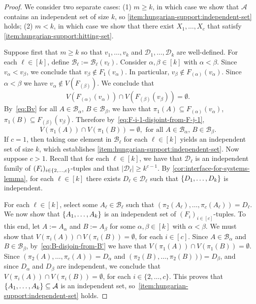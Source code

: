 \documentclass{patmorin}
\DeclarePairedDelimiter\set{\{}{\}}
\begin{document}
\begin{proof}
We consider two separate cases:
(1) $m\geq k$, in which case we show that $\mathcal{A}$ contains an independent set of size $k$, so \eqref{item:hungarian-support:independent-set} holds;
(2) $m<k$, in which case we show that there exist $X_1,\ldots,X_c$ that satisfy \eqref{item:hungarian-support:hitting-set}.

Suppose first that $m\geq k$ so that $v_1,\ldots,v_k$ and $\mathcal{D}_1,\ldots,\mathcal{D}_k$ are well-defined.  For each $\ell\in[k]$, define $\mathcal{B}_{\ell}:=\mathcal{B}_{\ell}(v_\ell)$. Consider $\alpha,\beta\in[k]$ with $\alpha<\beta$. Since $v_{\alpha} < v_{\beta}$, we conclude that $v_{\beta} \not\in F_1(v_{\alpha})$. In particular, $v_{\beta} \not\in F_{(\alpha)}(v_{\alpha})$. Since $\alpha<\beta$ we have $v_{\alpha}\not\in V(F_{(\beta)})$. We conclude that
\begin{equation}
  V(F_{(\alpha)}(v_{\alpha})) \cap V(F_{(\beta)}(v_{\beta})) = \emptyset.
  \label{eq:F-i-1-disjoint-from-F-j-1}
\end{equation}
By~\eqref{eq:Bv} for all $A\in \mathcal{B}_{\alpha}$, $B\in\mathcal{B}_{\beta}$, we have that
$\pi_1(A)\subseteq F_{(\alpha)}(v_{\alpha})$,  $\pi_1(B)\subseteq F_{(\beta)}(v_{\beta})$.
Therefore by~\eqref{eq:F-i-1-disjoint-from-F-j-1},
\begin{equation}
V(\pi_1(A)) \cap V(\pi_1(B))=\emptyset, \textrm{ for all $A\in\mathcal{B}_\alpha$, $B\in\mathcal{B}_\beta$.}
\label{eq:B-disjoin-from-B'}
\end{equation}
If $c=1$, then taking one element in $\mathcal{B}_\ell$ for each $\ell\in[k]$ yields an independent set of size $k$, which establishes \cref{item:hungarian-support:independent-set}.  Now suppose $c>1$.
Recall that for each $\ell\in[k]$,
we have that $\mathcal{D}_\ell$ is an independent family of
$(F_i)_{i\in\set{2,\ldots,c}}$-tuples and that
$|\mathcal{D}_{\ell}|\geq k^{c-1}$.
By \cref{cor:interface-for-systems-lemma}, for each $\ell\in[k]$ there exists $D_\ell\in\mathcal{D}_\ell$ such that $\set{D_1,\ldots,D_k}$ is independent.

For each $\ell\in[k]$, select some $A_\ell\in\mathcal{B}_\ell$ such that $(\pi_2(A_\ell),\ldots,\pi_c(A_\ell))=D_\ell$.   We now show that $\set{A_1,\ldots,A_k}$ is an independent set of $(F_i)_{i\in[c]}$-tuples.
To this end, let $A:=A_\alpha$ and $B:=A_\beta$ for some $\alpha,\beta\in[k]$ with $\alpha < \beta$.  We must show that $V(\pi_i(A))\cap V(\pi_i(B))=\emptyset$, for each $i\in[c]$.
Since $A\in\mathcal{B}_{\alpha}$ and $B\in\mathcal{B}_{\beta}$, by~\eqref{eq:B-disjoin-from-B'} we have that $V(\pi_1(A))\cap V(\pi_1(B))=\emptyset$.
Since $(\pi_2(A),\ldots,\pi_c(A))=D_{\alpha}$ and $(\pi_2(B),\ldots,\pi_2(B)))=D_{\beta}$, and since $D_\alpha$ and $D_\beta$ are independent, we conclude that
$V(\pi_i(A)) \cap V(\pi_i(B))=\emptyset$, for each $i\in\{2,\ldots,c\}$.
This proves that $\set{A_1,\ldots,A_k}\subseteq\mathcal{A}$ is an independent set, so~\eqref{item:hungarian-support:independent-set} holds.


\end{proof}
\end{document}
